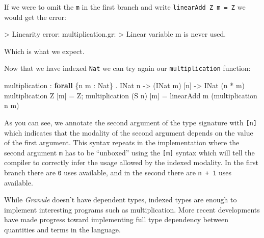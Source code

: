 \documentclass[
]{article}
\newenvironment{Shaded}{}{}
\newcommand{\DataTypeTok}[1]{\textcolor[rgb]{0.56,0.13,0.00}{#1}}
\newcommand{\FunctionTok}[1]{\textcolor[rgb]{0.02,0.16,0.49}{#1}}
\newcommand{\KeywordTok}[1]{\textcolor[rgb]{0.00,0.44,0.13}{\textbf{#1}}}
\newcommand{\NormalTok}[1]{#1}
\newcommand{\OperatorTok}[1]{\textcolor[rgb]{0.40,0.40,0.40}{#1}}
\newcommand{\OtherTok}[1]{\textcolor[rgb]{0.00,0.44,0.13}{#1}}
\begin{document}
If we were to omit the \texttt{m} in the first branch and write
\texttt{linearAdd\ Z\ m\ =\ Z} we would get the error:

\begin{Shaded}
\begin{Highlighting}[]
\OperatorTok{\textgreater{}} \DataTypeTok{Linearity} \FunctionTok{error}\OperatorTok{:}\NormalTok{ multiplication}\OperatorTok{.}\NormalTok{gr}\OperatorTok{:}
\OperatorTok{\textgreater{}} \DataTypeTok{Linear}\NormalTok{ variable }\OtherTok{\textasciigrave{}m\textasciigrave{}}\NormalTok{ is never used}\OperatorTok{.}
\end{Highlighting}
\end{Shaded}

Which is what we expect.

Now that we have indexed \texttt{Nat} we can try again our
\texttt{multiplication} function:

\begin{Shaded}
\begin{Highlighting}[]
\NormalTok{multiplication }\OperatorTok{:} \KeywordTok{forall}\NormalTok{ \{n m }\OperatorTok{:} \DataTypeTok{Nat}\NormalTok{\} }\OperatorTok{.} \DataTypeTok{INat}\NormalTok{ n }\OtherTok{{-}\textgreater{}}\NormalTok{ (}\DataTypeTok{INat}\NormalTok{ m) [n] }\OtherTok{{-}\textgreater{}} \DataTypeTok{INat}\NormalTok{ (n }\OperatorTok{*}\NormalTok{ m)}
\NormalTok{multiplication }\DataTypeTok{Z}\NormalTok{ [m] }\OtherTok{=} \DataTypeTok{Z}\NormalTok{;}
\NormalTok{multiplication (}\DataTypeTok{S}\NormalTok{ n) [m] }\OtherTok{=}\NormalTok{ linearAdd m (multiplication n m)}
\end{Highlighting}
\end{Shaded}

As you can see, we annotate the second argument of the type signature
with \texttt{{[}n{]}} which indicates that the modality of the second
argument depends on the value of the first argument. This syntax repeats
in the implementation where the second argument \texttt{m} has to be
``unboxed'' using the \texttt{{[}m{]}} syntax which will tell the
compiler to correctly infer the usage allowed by the indexed modality.
In the first branch there are \texttt{0} uses available, and in the
second there are \texttt{n\ +\ 1} uses available.

While \emph{Granule} doesn't have dependent types, indexed types are
enough to implement interesting programs such as multiplication. More
recent developments have made progress toward implementing full type
dependency between quantities and terms in the language.
\end{document}
